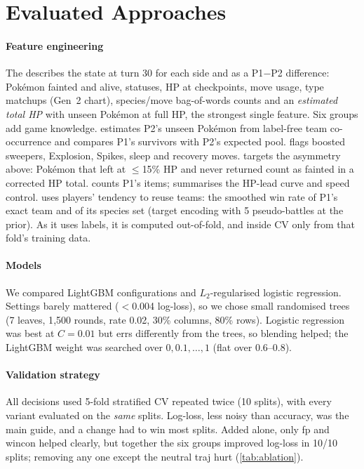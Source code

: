 \section{Evaluated Approaches}
\label{sec:approaches}

\paragraph{Feature engineering}
The  describes the state at turn 30 for each side and as a P1$-$P2 difference: Pok\'emon fainted and alive, statuses, HP at checkpoints, move usage, type matchups (Gen~2 chart), species/move bag-of-words counts and an \emph{estimated total HP} with unseen Pok\'emon at full HP, the strongest single feature.
Six groups add game knowledge.
 estimates P2's unseen Pok\'emon from label-free team co-occurrence and compares P1's survivors with P2's expected pool.
 flags boosted sweepers, Explosion, Spikes, sleep and recovery moves.
 targets the asymmetry above: Pok\'emon that left at $\leq$15\% HP and never returned count as fainted in a corrected HP total.
 counts P1's items;  summarises the HP-lead curve and speed control.
 uses players' tendency to reuse teams: the smoothed win rate of P1's exact team and of its species set (target encoding with 5 pseudo-battles at the prior).
As it uses labels, it is computed out-of-fold, and inside CV only from that fold's training data.

\paragraph{Models}
We compared LightGBM configurations and $L_2$-regularised logistic regression.
Settings barely mattered ($<$0.004 log-loss), so we chose small randomised trees (7 leaves, 1{,}500 rounds, rate 0.02, 30\% columns, 80\% rows).
Logistic regression was best at $C{=}0.01$ but errs differently from the trees, so blending helped; the LightGBM weight was searched over $0,0.1,\dots,1$ (flat over 0.6--0.8).

\paragraph{Validation strategy}
All decisions used 5-fold stratified CV repeated twice (10 splits), with every variant evaluated on the \emph{same} splits.
Log-loss, less noisy than accuracy, was the main guide, and a change had to win most splits.
Added alone, only fp and wincon helped clearly, but together the six groups improved log-loss in 10/10 splits; removing any one except the neutral traj hurt (\cref{tab:ablation}).

